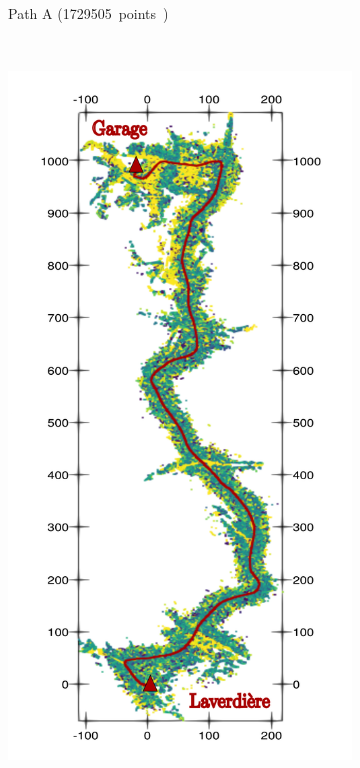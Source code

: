 \begin{figure}[htpb]
\begin{center}
\begin{subfigure}[b]{0.32\textwidth}
			\label{fig:ltr_a}
			\caption{Path A (\SI{1729505} points)}
		\end{subfigure}%
		~
		\begin{subfigure}[b]{0.32\textwidth}
			\includegraphics[width=\linewidth]{figs/ltr_map_traj/path_b.pdf}

\end{subfigure}
\end{center}
\end{figure}
